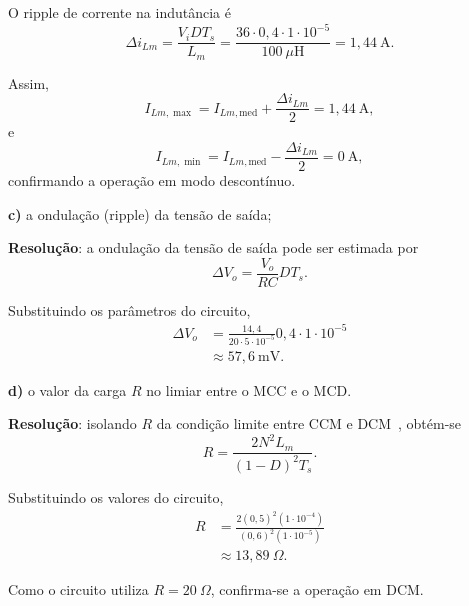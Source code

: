 O ripple de corrente na indutância é~\cite{flyback_notas}
\begin{equation*}
	\Delta i_{Lm}
	=
	\frac{V_iDT_s}{L_m}
	=
	\frac{36\cdot0{,}4\cdot1\cdot10^{-5}}
	{100~\mu\mathrm{H}}
	=
	1{,}44~\mathrm{A}.
\end{equation*}

Assim,~\cite{flyback_notas}
\begin{equation*}
	I_{Lm,\max}
	=
	I_{Lm,\mathrm{med}}
	+
	\frac{\Delta i_{Lm}}{2}
	=
	1{,}44~\mathrm{A},
\end{equation*}
e
\begin{equation*}
	I_{Lm,\min}
	=
	I_{Lm,\mathrm{med}}
	-
	\frac{\Delta i_{Lm}}{2}
	=
	0~\mathrm{A},
\end{equation*}
confirmando a operação em modo descontínuo.

\medskip
\textbf{c)} a ondulação (ripple) da tensão de saída;

\medskip
\textbf{Resolução}: a ondulação da tensão de saída pode ser estimada por~\cite{flyback_notas}
\begin{equation*}
	\Delta V_o
	=
	\frac{V_o}{RC}DT_s.
\end{equation*}

Substituindo os parâmetros do circuito,
\begin{equation*}
	\begin{aligned}
		\Delta V_o
		&=
		\frac{14{,}4}
		{20\cdot5\cdot10^{-5}}
		0,4\cdot1\cdot10^{-5}\\
		&\approx57{,}6~\mathrm{mV}.
	\end{aligned}
\end{equation*}

\medskip
\textbf{d)} o valor da carga $R$ no limiar entre o MCC e o MCD.

\medskip
\textbf{Resolução}: isolando $R$ da condição limite entre CCM e DCM~\cite{flyback_notas}, obtém-se
\begin{equation}
	R
	=
	\frac{2N^2L_m}
	{(1-D)^2T_s}.
\end{equation}

Substituindo os valores do circuito,
\begin{equation}
	\begin{aligned}
		R
		&=
		\frac{2(0,5)^2(1\cdot10^{-4})}
		{(0,6)^2(1\cdot10^{-5})}\\
		&\approx13{,}89~\Omega.
	\end{aligned}
\end{equation}

Como o circuito utiliza $R=20~\Omega$, confirma-se a operação em DCM.






